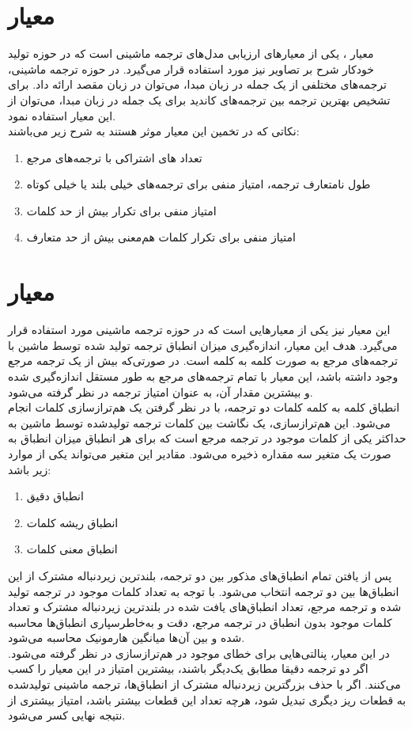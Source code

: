 \section{معیار  \cite{papineni2002bleu}}
معیار
، یکی از معیارهای ارزیابی مدل‌های ترجمه ماشینی است که در حوزه تولید خودکار شرح بر تصاویر نیز مورد استفاده قرار می‌گیرد. در حوزه ترجمه ماشینی، ترجمه‌های مختلفی از یک جمله در زبان مبدا، می‌توان در زبان مقصد ارائه داد. برای تشخیص بهترین ترجمه بین ترجمه‌های کاندید برای یک جمله در زبان مبدا، می‌توان از این معیار استفاده نمود.
\\
نکاتی که در تخمین این معیار موثر هستند به شرح زیر می‌باشند:
\begin{enumerate}
	\item تعداد های اشتراکی با ترجمه‌های مرجع
	\item طول نامتعارف ترجمه، امتیاز منفی برای ترجمه‌های خیلی بلند یا خیلی کوتاه
	\item امتیاز منفی برای تکرار بیش از حد کلمات
	\item امتیاز منفی برای تکرار کلمات هم‌معنی بیش از حد متعارف
\end{enumerate}


\section{معیار \cite{lavie2007meteor}}
این معیار نیز یکی از معیارهایی است که در حوزه ترجمه ماشینی مورد استفاده قرار می‌گیرد. هدف این معیار، اندازه‌گیری میزان انطباق ترجمه تولید شده توسط ماشین با ترجمه‌های مرجع به صورت کلمه به کلمه است. در صورتی‌که بیش از یک ترجمه مرجع وجود داشته باشد، این معیار با تمام ترجمه‌های مرجع به طور مستقل اندازه‌گیری شده و بیشترین مقدار آن، به عنوان امتیاز ترجمه در نظر گرفته می‌شود.
\\
انطباق کلمه‌ به کلمه کلمات دو ترجمه، با در نظر گرفتن یک هم‌ترازسازی کلمات انجام می‌شود. این هم‌ترازسازی، یک نگاشت بین کلمات ترجمه تولیدشده توسط ماشین به حداکثر یکی از کلمات موجود در ترجمه مرجع است که برای هر انطباق میزان انطباق به صورت یک متغیر سه مقداره ذخیره می‌شود. مقادیر این متغیر می‌تواند یکی از موارد زیر باشد:
\begin{enumerate}
	\item انطباق دقیق
	\item انطباق ریشه کلمات
	\item انطباق معنی کلمات
\end{enumerate}

پس از یافتن تمام انطباق‌های مذکور بین دو ترجمه، بلندترین زیردنباله مشترک از این انطباق‌ها بین دو ترجمه انتخاب می‌شود. با توجه به تعداد کلمات موجود در ترجمه‌ تولید شده و ترجمه مرجع، تعداد انطباق‌های یافت شده در بلندترین زیردنباله مشترک و تعداد کلمات موجود بدون انطباق در ترجمه مرجع، دقت و به‌خاطرسپاری انطباق‌ها محاسبه شده و بین آن‌ها میانگین هارمونیک محاسبه می‌شود. 
\\
در این معیار، پنالتی‌هایی برای خطای موجود در هم‌ترازسازی در نظر گرفته می‌شود. اگر دو ترجمه دقیقا مطابق یک‌دیگر باشند، بیشترین امتیاز در این معیار را کسب می‌کنند. اگر با حذف بزرگترین زیردنباله مشترک از انطباق‌ها، ترجمه ماشینی تولیدشده به قطعات ریز دیگری تبدیل شود، هرچه تعداد این قطعات بیشتر باشد، امتیاز بیشتری از نتیجه نهایی کسر می‌شود. 

